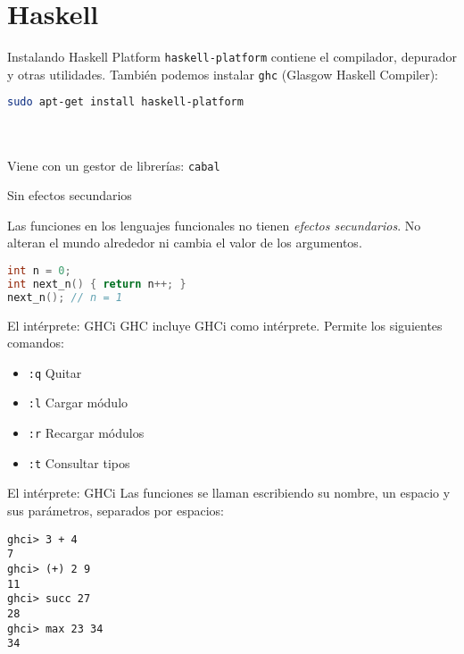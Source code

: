 \section{Haskell}

\begin{frame}[fragile]{Instalando Haskell Platform}
  \texttt{haskell-platform} contiene el compilador, depurador y otras utilidades.
  También podemos instalar \texttt{ghc} (Glasgow Haskell Compiler):
  \espacio
  \begin{lstlisting}[language=bash]
sudo apt-get install haskell-platform
  \end{lstlisting}
  \\~\\
  Viene con un gestor de librerías: \texttt{cabal}
\end{frame}

\begin{frame}[fragile]{Sin efectos secundarios}

    Las funciones en los lenguajes funcionales no tienen \textit{efectos secundarios}.
    No alteran el mundo alrededor ni cambia el valor de los argumentos.
    \espacio
  \begin{lstlisting}[language=C++]
int n = 0;
int next_n() { return n++; }
next_n(); // n = 1
  \end{lstlisting}

\end{frame}

\begin{frame}{El intérprete: GHCi}
  GHC incluye GHCi como intérprete. Permite los siguientes comandos:
  \espacio
  \begin{itemize}
    \item \texttt{:q} \qquad  Quitar
    \item \texttt{:l} \qquad  Cargar módulo
    \item \texttt{:r} \qquad  Recargar módulos
    \item \texttt{:t} \qquad  Consultar tipos
  \end{itemize}

\end{frame}

\begin{frame}[fragile]{El intérprete: GHCi}
 Las funciones se llaman escribiendo su nombre, un espacio y sus parámetros, separados por espacios:
\espacio
  \begin{lstlisting}
ghci> 3 + 4
7
ghci> (+) 2 9
11
ghci> succ 27
28
ghci> max 23 34
34
  \end{lstlisting}

\end{frame}
